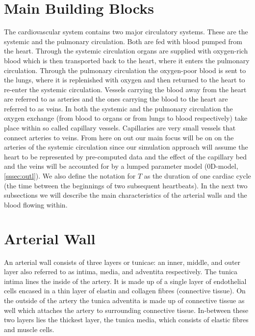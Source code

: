 \documentclass[a4paper, oneside]{discothesis}
\begin{document}
\section{Main Building Blocks} \label{sec:mbb}
The cardiovascular system contains two major circulatory systems.
These are the systemic and the pulmonary circulation. 
Both are fed with blood pumped from the heart.
Through the systemic circulation organs are supplied with oxygen-rich blood which is then transported back to the heart, where it enters the pulmonary circulation.
Through the pulmonary circulation the oxygen-poor blood is sent to the lungs, where it is replenished with oxygen and then returned to the heart to re-enter the systemic circulation.
Vessels carrying the blood away from the heart are referred to as arteries and the ones carrying the blood to the heart are referred to as veins.
In both the systemic and the pulmonary circulation the oxygen exchange (from blood to organs or from lungs to blood respectively) take place within so called capillary vessels.
Capillaries are very small vessels that connect arteries to veins. \cite{köppl2023dimension}
From here on out our main focus will be on on the arteries of the systemic circulation since our simulation approach will assume the heart to be represented by pre-computed data and the effect of the capillary bed and the veins will be accounted for by a lumped parameter model (0D-model, \autoref{sssec:outl}).
We also define the notation for $T$ as the duration of one cardiac cycle (the time between the beginnings of two subsequent heartbeats).
In the next two subsections we will describe the main characteristics of the arterial walls and the blood flowing within.

\section{Arterial Wall} \label{sec:aw}
An arterial wall consists of three layers or tunicae: an inner, middle, and outer layer also referred to as intima, media, and adventita respectively.
The tunica intima lines the inside of the artery. It is made up of a single layer of endothelial cells encased in a thin layer of elastin and collagen fibres (connective tissue). 
On the outside of the artery the tunica adventita is made up of connective tissue as well which attaches the artery to surrounding connective tissue.
In-between these two layers lies the thickest layer, the tunica media, which consists of elastic fibres and muscle cells. 
\end{document}
